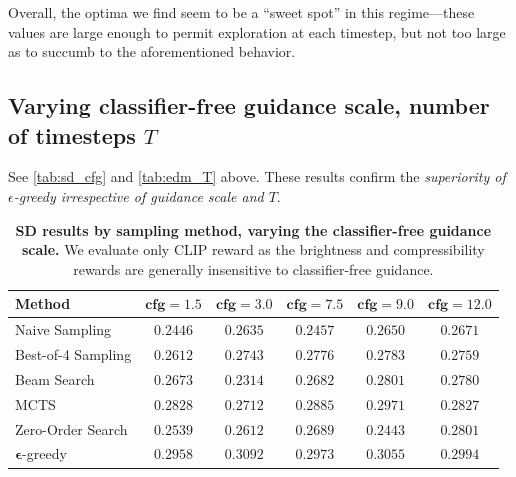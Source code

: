 \documentclass{article}
\begin{document}
Overall, the optima we find seem to be a ``sweet spot'' in this regime---these values are large enough to permit exploration at each timestep, but not too large as to succumb to the aforementioned behavior.

\subsection{Varying classifier-free guidance scale, number of timesteps $T$}

See \autoref{tab:sd_cfg} and \autoref{tab:edm_T} above. These results confirm the \textit{superiority of 
$\epsilon$-greedy irrespective of guidance scale and $T$}.

\begin{table}
  \centering
  \caption{\small \textbf{SD results by sampling method, varying the classifier-free guidance scale.} We evaluate only CLIP reward as the brightness and compressibility rewards are generally insensitive to classifier-free guidance.}
  \label{tab:sd_cfg}
  \begin{tabular}{lccccc}
    \toprule
    \textbf{Method} & $\mathbf{cfg = 1.5}$ & $\mathbf{cfg = 3.0}$ & $\mathbf{cfg = 7.5}$ & $\mathbf{cfg = 9.0}$ & $\mathbf{cfg = 12.0}$ \\
    \midrule
    Naive Sampling       & $0.2446$ & $0.2635$ & $0.2457$ & $0.2650$ & $0.2671$ \\
    Best-of-4 Sampling   & $0.2612$ & $0.2743$ & $0.2776$ & $0.2783$ & $0.2759$ \\
    Beam Search          & $0.2673$ & $0.2314$ & $0.2682$ & $0.2801$ & $0.2780$ \\
    MCTS                 & $0.2828$ & $0.2712$ & $0.2885$ & $0.2971$ & $0.2827$ \\
    Zero-Order Search    & $0.2539$ & $0.2612$ & $0.2689$ & $0.2443$ & $0.2801$ \\
    $\bm{\epsilon}$-greedy & $\mathbf{0.2958}$ & $\mathbf{0.3092}$ & $\mathbf{0.2973}$ & $\mathbf{0.3055}$ & $\mathbf{0.2994}$ \\
    \bottomrule
  \end{tabular}
\end{table}
\end{document}
